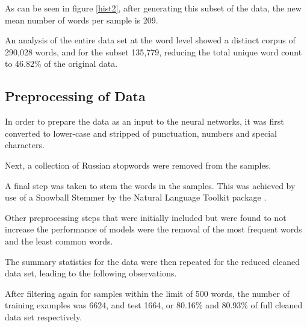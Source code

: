 \documentclass[12pt]{article}
\begin{document}
As can be seen in figure \ref{hist2}, after generating this subset of the data, the new mean number of words per sample is 209.


An analysis of the entire data set at the word level showed a distinct corpus of 290,028 words, and for the subset 135,779, reducing the total unique word count to 46.82\% of the original data.


\subsection{Preprocessing of Data}

In order to prepare the data as an input to the neural networks, it was first converted to lower-case and stripped of punctuation, numbers and special characters.



Next, a collection of Russian stopwords were removed from the samples. \parencite{russianNLP}


A final step was taken to stem the words in the samples. This was achieved by use of a Snowball Stemmer by the Natural Language Toolkit package \parencite{nltk}. 



Other preprocessing steps that were initially included but were found to not increase the performance of models were the removal of the most frequent words and the least common words.


The summary statistics for the data were then repeated for the reduced cleaned data set, leading to the following observations. 

After filtering again for samples within the limit of 500 words, the number of training examples was 6624, and test 1664, or 80.16\% and 80.93\% of full cleaned data set respectively.
\end{document}
